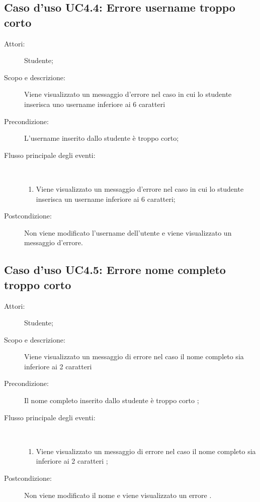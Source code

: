 \subsection{Caso d'uso UC4.4: Errore username troppo corto}\begin{description}
	\item[Attori:] Studente;
	\item[Scopo e descrizione:] Viene visualizzato un messaggio d'errore nel caso in cui lo studente inserisca uno username inferiore ai 6 caratteri
	\item[Precondizione:] L'username inserito dallo studente è troppo corto;
	
	\item[Flusso principale degli eventi:] \ 
	\begin{enumerate}
		\item Viene visualizzato un messaggio d'errore nel caso in cui lo studente inserisca un username inferiore ai 6 caratteri;
		
	\end{enumerate}
	\item[Postcondizione:] Non viene modificato l'username dell'utente e viene visualizzato un messaggio d'errore.
\end{description}
\hypertarget{UC4.5}{}
\subsection{Caso d'uso UC4.5: Errore nome completo troppo corto}\begin{description}
	\item[Attori:] Studente;
	\item[Scopo e descrizione:] Viene visualizzato un messaggio di errore nel caso il nome completo sia inferiore ai 2 caratteri
	
	\item[Precondizione:] Il nome completo inserito dallo studente è troppo corto
	;
	
	\item[Flusso principale degli eventi:] \ 
	\begin{enumerate}
		\item Viene visualizzato un messaggio di errore nel caso il nome completo sia inferiore ai 2 caratteri	;
		
	\end{enumerate}
	\item[Postcondizione:] Non viene modificato il nome e viene visualizzato un errore
	.
\end{description}
\hypertarget{UC4.6}{}
